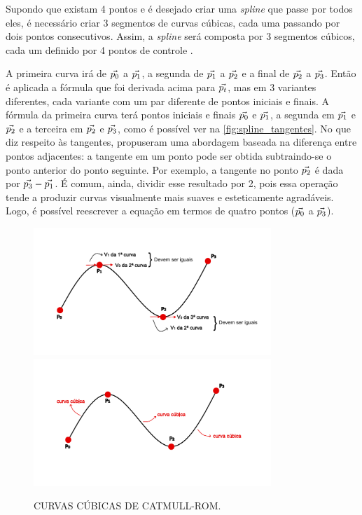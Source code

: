  Supondo que existam 4 pontos e é desejado criar uma \textit{spline} que passe por todos eles, é necessário criar 3 segmentos de curvas cúbicas, cada uma passando por dois pontos consecutivos. Assim, a \textit{spline} será composta por 3 segmentos cúbicos, cada um definido por 4 pontos de controle \cite{CatmullRom}.

 A primeira curva irá de ${\vec{p_0}}$ a ${\vec{p_1}}$, a segunda de ${\vec{p_1}}$ a ${\vec{p_2}}$ e a final de ${\vec{p_2}}$ a ${\vec{p_3}}$. Então é aplicada a fórmula que foi derivada acima para ${\vec{p_t}}$, mas em 3 variantes diferentes, cada variante com um par diferente de pontos iniciais e finais. A fórmula da primeira curva terá pontos iniciais e finais ${\vec{p_0}}$ e ${\vec{p_1}}$, a segunda em ${\vec{p_1}}$ e ${\vec{p_2}}$ e a terceira em ${\vec{p_2}}$ e ${\vec{p_3}}$, como é possível ver na \autoref{fig:spline_tangentes}. No que diz respeito às tangentes, \citet{CatmullRom} propuseram uma abordagem baseada na diferença entre pontos adjacentes: a tangente em um ponto pode ser obtida subtraindo-se o ponto anterior do ponto seguinte. Por exemplo, a tangente no ponto ${\vec{p_2}}$ é dada por ${\vec{p_3}} - {\vec{p_1}}$. É comum, ainda, dividir esse resultado por 2, pois essa operação tende a produzir curvas visualmente mais suaves e esteticamente agradáveis. Logo, é possível reescrever a equação em termos de quatro pontos (${\vec{p_0}}$ a ${\vec{p_3}}$).


\begin{figure}[h!]
    \caption{CURVAS CÚBICAS DE CATMULL-ROM.}
    \centering
    \includegraphics[width=0.8\textwidth]{fig/sp1.pdf}
    \vspace{0.5em} %
    \includegraphics[width=0.8\textwidth]{fig/sp2.pdf}
    \label{fig:spline_tangentes}
\end{figure}


